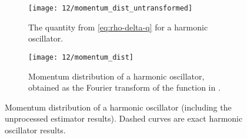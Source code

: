 \begin{figure}
	\setlength{\figspacing}{10 mm}
	\centering
	\begin{subfigure}[b]{\textwidth}
		\texttt{[image: 12/momentum\_dist\_untransformed]}
		\caption{
			The quantity from \cref{eq:rho-delta-q} for a harmonic oscillator.
		}
		\label{fig:momentum-dist-untransformed}
		\vspace{\figspacing}
	\end{subfigure}
	\begin{subfigure}[b]{\textwidth}
		\texttt{[image: 12/momentum\_dist]}
		\caption{
			Momentum distribution of a harmonic oscillator, obtained as the Fourier transform of the function in .
		}
	\end{subfigure}
	\caption[
		Broken path momentum distribution
	]{
		Momentum distribution of a harmonic oscillator (including the unprocessed estimator results).
		Dashed curves are exact harmonic oscillator results.
	}
	\label{fig:momentum-dist}
\end{figure}

